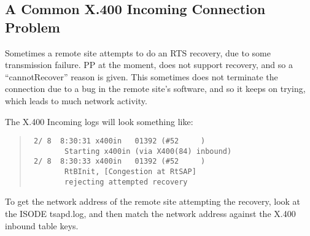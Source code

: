 \subsection{A Common X.400 Incoming Connection Problem}

Sometimes a remote site attempts to do an RTS recovery, due to some
transmission failure. PP at the moment, does not support recovery, and
so a ``cannotRecover'' reason is given. This sometimes does not
terminate the connection due to a bug in the remote site's software,
and so it keeps on trying, which leads to much network activity.

The X.400 Incoming logs will look something like: 

\begin{quote}\small\begin{verbatim}
 2/ 8  8:30:31 x400in   01392 (#52     )  
        Starting x400in (via X400(84) inbound)
 2/ 8  8:30:33 x400in   01392 (#52     )  
        RtBInit, [Congestion at RtSAP] 
        rejecting attempted recovery
\end{verbatim}\end{quote}


To get the network address of the remote site attempting the recovery,
look at the ISODE tsapd.log, and then match the network address
against the X.400 inbound table keys.


